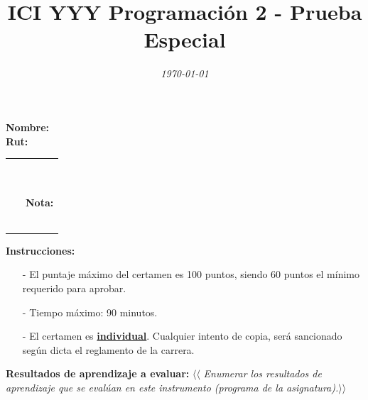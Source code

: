 \documentclass{exam}
\title{\LARGE\color{azul}\textbf{ICI YYY Programaci\'on 2 - Prueba Especial}}
\author{\normalsize \color{gray}{Prof.} \color{black}{\textbf{Eduardo Godoy}}}
\date{\normalsize \em \today}
\begin{document}

\maketitle

\begin{multicols}{2} \begin{flushleft} \textbf{Nombre:} \\ \vspace*{2mm} \textbf{Rut:} \end{flushleft} \begin{center} \begin{table}[H] \begin{tabular}{p{4cm}|p{3cm}|} \arrayrulecolor{gray!50}\cline{2-2} ~ & {\em {\scriptsize \color{gray!50}{Puntaje:}}} \\ & ~ \\ ~ & \textbf{Nota:} \\ & ~ \\ \arrayrulecolor{gray!50}\cline{2-2} \end{tabular} \end{table} \end{center} \end{multicols}

\vspace*{-18mm}
\noindent
\textbf{Instrucciones:} 
\begin{itemize}
    \item[-] El puntaje m\'aximo del certamen es 100 puntos, siendo 60 puntos el m\'inimo requerido para aprobar.
    \item[-] Tiempo m\'aximo: 90 minutos.
    \item[-] El certamen es \underline{\textbf{individual}}. Cualquier intento de copia, ser\'a sancionado seg\'un dicta el reglamento de la carrera.
\end{itemize}

\noindent
\textbf{Resultados de aprendizaje a evaluar:} $\langle\langle$ {\em Enumerar los resultados de aprendizaje que se eval{\'u}an en este instrumento (programa de la asignatura).}$\rangle\rangle$
\vspace{2mm}
\end{document}
